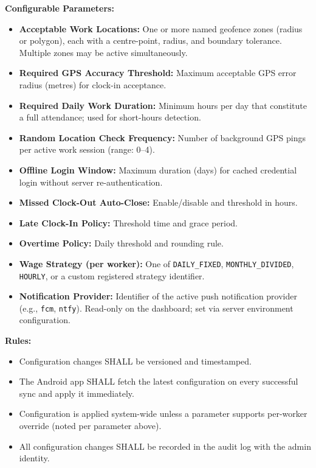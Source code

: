 \documentclass[12pt, a4paper]{article}
\newcommand{\srsfield}[1]{\noindent\textbf{#1:}\par}
\begin{document}
\srsfield{Configurable Parameters}
\begin{itemize}
    \item \textbf{Acceptable Work Locations:} One or more named geofence
          zones (radius or polygon), each with a centre-point, radius,
          and boundary tolerance. Multiple zones may be active
          simultaneously.
    \item \textbf{Required GPS Accuracy Threshold:} Maximum acceptable
          GPS error radius (metres) for clock-in acceptance.
    \item \textbf{Required Daily Work Duration:} Minimum hours per day
          that constitute a full attendance; used for short-hours
          detection.
    \item \textbf{Random Location Check Frequency:} Number of background
          GPS pings per active work session (range: 0--4).
    \item \textbf{Offline Login Window:} Maximum duration (days) for
          cached credential login without server re-authentication.
    \item \textbf{Missed Clock-Out Auto-Close:} Enable/disable and
          threshold in hours.
    \item \textbf{Late Clock-In Policy:} Threshold time and grace period.
    \item \textbf{Overtime Policy:} Daily threshold and rounding rule.
    \item \textbf{Wage Strategy (per worker):} One of \texttt{DAILY\_FIXED},
          \texttt{MONTHLY\_DIVIDED}, \texttt{HOURLY}, or a custom
          registered strategy identifier.
    \item \textbf{Notification Provider:} Identifier of the active push
          notification provider (e.g., \texttt{fcm}, \texttt{ntfy}).
          Read-only on the dashboard; set via server environment
          configuration.
\end{itemize}

\srsfield{Rules}
\begin{itemize}
    \item Configuration changes SHALL be versioned and timestamped.
    \item The Android app SHALL fetch the latest configuration on every
          successful sync and apply it immediately.
    \item Configuration is applied system-wide unless a parameter
          supports per-worker override (noted per parameter above).
    \item All configuration changes SHALL be recorded in the audit log
          with the admin identity.
\end{itemize}
\end{document}
